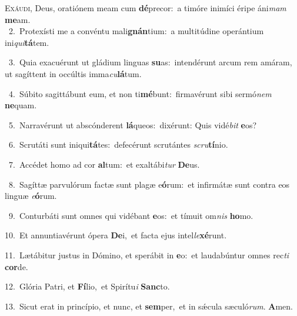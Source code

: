 \lettrine{\initial\textcolor{\initialcolor}{E}}{xáudi,} Deus, oratiónem meam cum \textbf{dé}\-precor:~\star a timóre inimíci éripe áni\textit{mam} \textbf{me}\-am.\\
{\numbfont\textcolor{\numbcolor}{~2.}}~Protexísti me a convéntu mali\-\textbf{gnán}\-tium:~\star a multitúdine operántium ini\-\textit{qui}\-\textbf{tá}tem.\par
{\numbfont\textcolor{\numbcolor}{~3.}}~Quia exacuérunt ut gládium linguas \textbf{su}\-as:~\star intendérunt arcum rem amáram, ut sagíttent in occúltis imma\-\textit{cu}\-\textbf{lá}tum.\par
{\numbfont\textcolor{\numbcolor}{~4.}}~Súbito sagittábunt eum, et non ti\-\textbf{mé}\-bunt:~\star firmavérunt sibi sermó\textit{nem} \textbf{ne}\-quam.\par
{\numbfont\textcolor{\numbcolor}{~5.}}~Narravérunt ut abscónderent \textbf{lá}\-queos:~\star dixérunt: Quis vidé\textit{bit} \textbf{e}\-os?\par
{\numbfont\textcolor{\numbcolor}{~6.}}~Scrutáti sunt iniqui\-\textbf{tá}\-tes:~\star defecérunt scrutántes \textit{scru}\-\textbf{tí}nio.\par
{\numbfont\textcolor{\numbcolor}{~7.}}~Accédet homo ad cor \textbf{al}\-tum:~\star et exaltábi\textit{tur} \textbf{De}\-us.\par
{\numbfont\textcolor{\numbcolor}{~8.}}~Sagíttæ parvulórum factæ sunt plagæ e\-\textbf{ó}\-rum:~\star et infirmátæ sunt contra eos linguæ \textit{e}\-\textbf{ó}rum.\par
{\numbfont\textcolor{\numbcolor}{~9.}}~Conturbáti sunt omnes qui vidébant \textbf{e}\-os:~\star et tímuit om\textit{nis} \textbf{ho}\-mo.\par
{\numbfont\textcolor{\numbcolor}{10.}}~Et annuntiavérunt ópera \textbf{De}\-i,~\star et facta ejus intel\-\textit{le}\-\textbf{xé}runt.\par
{\numbfont\textcolor{\numbcolor}{11.}}~Lætábitur justus in Dómino, et sperábit in \textbf{e}\-o:~\star et laudabúntur omnes rec\textit{ti} \textbf{cor}\-de.\par
{\numbfont\textcolor{\numbcolor}{12.}}~Glória Patri, et \textbf{Fí}\-lio,~\star et Spirítu\textit{i} \textbf{Sanc}\-to.\par
{\numbfont\textcolor{\numbcolor}{13.}}~Sicut erat in princípio, et nunc, et \textbf{sem}\-per,~\star et in sǽcula sæculó\-\textit{rum}\-. \textbf{A}\-men.\par
